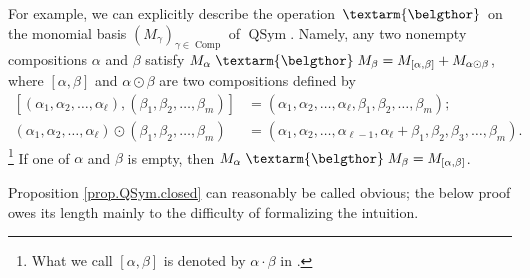 \documentclass[numbers=enddot,12pt,final,onecolumn,notitlepage,abstracton]{scrartcl}%
\theoremstyle{definition}
\newenvironment{verlong}{}{}
\newcommand{\bel}{\left. \textarm{\belgthor} \right.}
\begin{document}
\begin{verlong}
For example, we can explicitly describe the operation $\bel $ on the monomial
basis $\left(  M_{\gamma}\right)  _{\gamma\in\operatorname*{Comp}}$ of
$\operatorname*{QSym}$. Namely, any two nonempty compositions $\alpha$ and
$\beta$ satisfy $M_{\alpha} \bel M_{\beta}=M_{\left[  \alpha,\beta\right]
}+M_{\alpha\odot\beta}$, where $\left[  \alpha,\beta\right]  $ and
$\alpha\odot\beta$ are two compositions defined by%
\begin{align*}
\left[  \left(  \alpha_{1},\alpha_{2},\ldots,\alpha_{\ell}\right)  ,\left(
\beta_{1},\beta_{2},\ldots,\beta_{m}\right)  \right]   &  =\left(  \alpha
_{1},\alpha_{2},\ldots,\alpha_{\ell},\beta_{1},\beta_{2},\ldots,\beta
_{m}\right)  ;\\
\left(  \alpha_{1},\alpha_{2},\ldots,\alpha_{\ell}\right)  \odot\left(
\beta_{1},\beta_{2},\ldots,\beta_{m}\right)   &  =\left(  \alpha_{1}%
,\alpha_{2},\ldots,\alpha_{\ell-1},\alpha_{\ell}+\beta_{1},\beta_{2},\beta
_{3},\ldots,\beta_{m}\right)  .
\end{align*}
\footnote{What we call $\left[  \alpha,\beta\right]  $ is denoted by
$\alpha\cdot\beta$ in \cite[before Proposition 5.1.7]{Reiner}.} If one of
$\alpha$ and $\beta$ is empty, then $M_{\alpha} \bel M_{\beta}=M_{\left[
\alpha,\beta\right]  }$.
\end{verlong}

Proposition \ref{prop.QSym.closed} can reasonably be called obvious; the below
proof owes its length mainly to the difficulty of formalizing the intuition.
\end{document}
